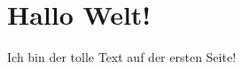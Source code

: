 \documentclass{article}
\begin{document}
\section{Hallo Welt!}
Ich bin der tolle Text auf der ersten Seite!
\end{document}
